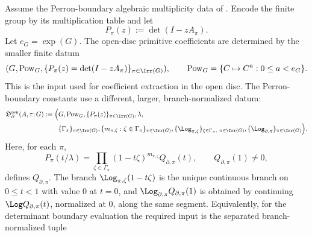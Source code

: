\begin{proposition}
  \label{thm:renormalized-finite-data-determination}
  \label{prop:finite-data-main-chain-closure}
  \label{prop:finite-data-main-factorisation-closure}
  Assume the Perron-boundary algebraic multiplicity data of
  .
  Encode the finite group by its multiplication table and let
  \[
    P_\pi(z):=\det(I-zA_\pi).
  \]
  Let \(e_G=\exp(G)\).  The open-disc primitive coefficients are determined by
  the smaller finite datum
  \begin{equation}\label{eq:open-disc-primitive-data}
    (G,\mathrm{Pow}_G,\{P_\pi(z)=\det(I-zA_\pi)\}_{\pi\in\Irr(G)}),
    \qquad
    \mathrm{Pow}_G=\{C\mapsto C^a:0\le a<e_G\}.
  \end{equation}
  This is the input used for coefficient extraction in the open disc.  The
  Perron-boundary constants use a different, larger, branch-normalized datum:
  \begin{equation}\label{eq:renormalized-finite-data-tuple}
    \begin{aligned}
      \mathfrak D_{\partial}^{\mathrm{ren}}(A,\tau;G):=
      \Bigl(&G,\mathrm{Pow}_G,\{P_\pi(z)\}_{\pi\in\Irr(G)},\lambda,\\
      &\{\Gamma_\pi\}_{\pi\in\Irr(G)},
        \{m_{\pi,\zeta}:\zeta\in\Gamma_\pi\}_{\pi\in\Irr(G)},
        \{\Log_{\pi,\zeta}\}_{\zeta\in\Gamma_\pi,\ \pi\in\Irr(G)},
        \{\Log_{\partial,\pi}\}_{\pi\in\Irr(G)}\Bigr).
    \end{aligned}
  \end{equation}
  Here, for each \(\pi\),
  \begin{equation}\label{eq:renormalized-finite-data-factorization}
    P_\pi(t/\lambda)
    =
    \prod_{\zeta\in\Gamma_\pi}(1-t\zeta)^{m_{\pi,\zeta}}
      Q_{\partial,\pi}(t),
    \qquad Q_{\partial,\pi}(1)\ne0,
  \end{equation}
  defines \(Q_{\partial,\pi}\).  The branch
  \(\Log_{\pi,\zeta}(1-t\zeta)\) is the unique continuous branch on
  \(0\le t<1\) with value \(0\) at \(t=0\), and
  \(\Log_{\partial,\pi}Q_{\partial,\pi}(1)\) is obtained by continuing
  \(\Log Q_{\partial,\pi}(t)\), normalized at \(0\), along the same segment.
  Equivalently, for the determinant boundary evaluation the required input is
  the separated branch-normalized tuple
  \begin{equation}\label{eq:perron-boundary-data-tuple-separated}
    \begin{aligned}

\end{aligned}
\end{equation}
\end{proposition}
